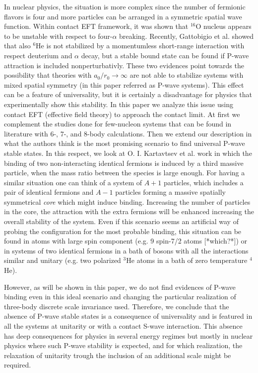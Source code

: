 \documentclass[preprint,12pt]{elsarticle}
\begin{document}
In nuclear physics, the situation is more complex since the number of fermionic flavors is four and more particles can be arranged in a symmetric spatial wave function.
Within contact EFT framework, it was shown \cite{Contessi:2017rww} that $^{16}$O nucleus appears to be unstable with respect to four-$\alpha$ breaking.
Recently, Gattobigio et al. \cite{Gattobigio:2019omi} showed that also $^{6}$He is not stabilized by a momentumless short-range interaction with respect deuterium and $\alpha$ decay, but a stable bound state can be found if P-wave attraction is included nonperturbativly.
These two evidences point towards the possibility that theories with $a_0/r_0\rightarrow \infty$ are not able to stabilize systems with mixed spatial symmetry (in this paper referred as P-wave systems).
This effect can be a feature of universality, but it is certainly a disadvantage for physics that experimentally show this stability.
In this paper we analyze this issue using contact EFT (effective field theory) to approach the contact limit. 
At first we complement the studies done for few-nucleon systems that can be found in literature with 6-, 7-, and 8-body calculations.
Then we extend our description in what the authors think is the most promising scenario to find universal P-wave stable states.
In this respect, we look at O. I. Kartavtsev et al. work \cite{Kartavtsev_2007} in which the binding of two non-interacting identical fermions is induced by a third massive particle, when the mass ratio between the species is large enough.
For having a similar situation one can think of a system of $A+1$ particles, which includes a pair of identical fermions and $A-1$ particles forming a massive spatially symmetrical \textit{core} which might induce binding.
Increasing the number of particles in the core, the attraction with the extra fermions will be enhanced increasing the overall stability of the system.
Even if this scenario seems an artificial way of probing the configuration for the most probable binding, this situation can be found in atoms with large spin component (e.g. 9 spin-7/2 atoms [*which?*]) or in systems of two identical fermions in a bath of bosons with all the interactions similar and unitary (e.g. two polarized $^3$He atoms in a bath of zero temperature $^4$He).

However, as will be shown in this paper, we do not find evidences of P-wave binding even in this ideal scenario and changing the particular realization of three-body discrete scale invariance used.
Therefore, we conclude that the absence of P-wave stable states is a consequence of universality and is featured in all the systems at unitarity or with a contact S-wave interaction.
This absence has deep consequences for physics in several energy regimes but mostly in nuclear physics where such P-wave stability is expected, and for which realization, the relaxation of unitarity trough the inclusion of an additional scale might be required.
\end{document}
